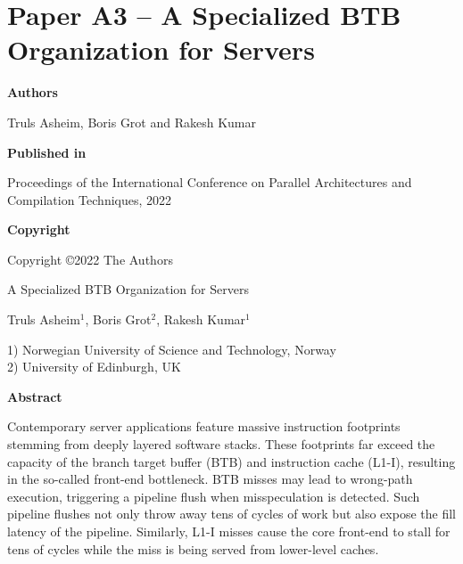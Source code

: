 \documentclass[../../../main.tex]{subfiles}
\begin{document}
\chapter{Paper A3 -- A Specialized BTB Organization for Servers}
\label{chap:pact-paper}

\noindent \textbf{Authors}

\vspace*{0.3cm}

\noindent Truls Asheim, Boris Grot and Rakesh Kumar

\vspace*{0.7cm}

\noindent \textbf{Published in}

\vspace*{0.3cm}

\noindent Proceedings of the International Conference on Parallel Architectures and Compilation Techniques, 2022

\vspace*{0.7cm}

\noindent \textbf{Copyright}

\vspace*{0.3cm}

\noindent Copyright ©2022 The Authors

\newpage

\vspace*{0.1cm}

\begin{center}

\Huge{A Specialized BTB Organization for Servers}

\vspace{0.6cm}

\large{Truls Asheim$^{1}$, Boris Grot$^{2}$, Rakesh Kumar$^{1}$}

\vspace{0.1cm}

\small{1) Norwegian University of Science and Technology, Norway}\\
\small{2) University of Edinburgh, UK}


\end{center}

\vspace{0.2cm}

\begin{center}
  \textbf{Abstract}
  \end{center}
\begin{changemargin}{0.75cm}{0.75cm}
Contemporary server applications feature massive instruction footprints stemming from deeply layered software stacks. These footprints far exceed the capacity of the branch target buffer (BTB) and instruction cache (L1-I), resulting in the so-called front-end bottleneck. BTB misses may lead to wrong-path execution, triggering a pipeline flush when misspeculation is detected. Such pipeline flushes not only throw away tens of cycles of work but also expose the fill latency of the pipeline. Similarly, L1-I misses cause the core front-end to stall for tens of cycles while the miss is being served from lower-level caches.
\end{changemargin}
\end{document}

